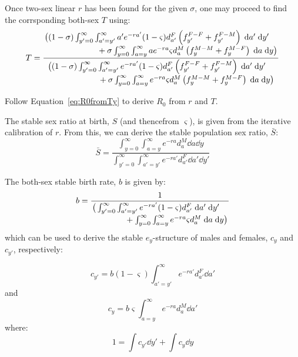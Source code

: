  \FloatBarrier
\label{sec:2sexlinearother}
Once two-sex linear $r$ has been found for the given $\sigma$, one may
proceed to find the corrsponding both-sex $T$ using:
\begin{equation}
T = \frac{\splitfrac{
   \big((1 - \sigma)  \int _{y'=0}^\infty \int_{a'=y'}^\infty 
       a'e^{-ra'} (1-\varsigma)d_{a'}^F \left( f_{y'}^{F-F} + f_{y'}^{F-M}
       \right) \dd a'\dd y'}{ + \sigma \int_{y=0}^\infty \int _{a=y}^\infty a
       e^{-ra}\varsigma d_{a}^M \left( f_{y}^{M-M}+ f_{y}^{M-F} \right) \dd a
       \dd y \big)}}{\splitfrac{\big( (1 - \sigma) \int_{y'=0}^\infty \int_{a'=y'}^\infty e^{-ra'} (1-\varsigma)d_{a'}^F \left(
   f_{y'}^{F-F} + f_{y'}^{F-M} \right) \dd a'\dd y'}{ +\sigma \int _{y=0}^\infty
   \int_{a=y}^\infty e^{-ra} \varsigma d_{a}^M \left( f_{y}^{M-M} + f_{y}^{M-F}
   \right) \dd a \dd y \big)}}
\end{equation}

Follow Equation~\eqref{eq:R0fromTy} to derive $R_0$ from $r$ and $T$. 

The stable sex ratio at birth, $S$ (and thencefrom $\varsigma$), is given from
the iterative calibration of $r$. From this, we can derive the stable
population sex ratio, $\bar{S}$:
\begin{equation}
\bar{S} = \frac{ \int_{y=0}^\infty \int_{a=y}^\infty e^{-ra} d_{a}^M \dd a \dd
y}{\int_{y'=0}^\infty \int_{a'=y'}^\infty e^{-ra'} d_{a'}^F \dd a' \dd
y'}
\end{equation}

The both-sex stable birth rate, $b$ is given by:
\begin{equation}
b = \frac{1}{
            \splitfrac{\big( \int _{y'=0}^\infty
            \int _{a'=y'}^\infty e^{-r a'} (1-\varsigma) d_{a'}^F \dd a' \dd
            y'}{ + \int _{y=0}^\infty \int _{a=y}^\infty
             e^{-r a} \varsigma d_{a}^M \dd a \dd y\big)}  }                   
\end{equation}
which can be used to derive the stable $e_y$-structure of males and females,
$c_y$ and $c_{y'}$, respectively:

\begin{equation}
c_{y'} = b (1-\varsigma) \int _{a'=y'}^\infty
e^{-ra'} d_{a'}^F \dd a'
\end{equation}
and
\begin{equation}
c_{y} = b \varsigma \int _{a=y}^\infty
e^{-ra} d_{a}^M \dd a'
\end{equation}
where:
\begin{equation}
1 = \int c_{y'} \dd y' + \int c_{y} \dd y
\end{equation}
